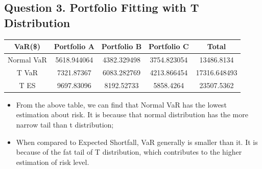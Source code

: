 \documentclass[a4paper,12pt]{article}
\begin{document}
\newpage
\subsection*{Question 3. Portfolio Fitting with T Distribution}

\begin{center}
    \begin{tabular}{ c|c|c|c|c}
     \hline
      VaR(\$) & Portfolio A & Portfolio B & Portfolio C & Total\\
     \hline
     Normal VaR&5618.944064&4382.329498&3754.823054	&13486.8134\\
     T VaR &7321.87367&6083.282769&4213.866454&17316.648493\\
     T ES &9697.83096&8192.52733&5858.4264&23507.5362\\
     \hline
    \end{tabular}
\end{center}

\begin{itemize}
    \item From the above table, we can find that Normal VaR has the lowest estimation about risk. It is because that normal distribution has the more narrow tail than t distribution;
    \item When compared to Expected Shortfall, VaR generally is smaller than it. It is because of the fat tail of T distribution, which contributes to the higher estimation of risk level.
\end{itemize}
\end{document}
